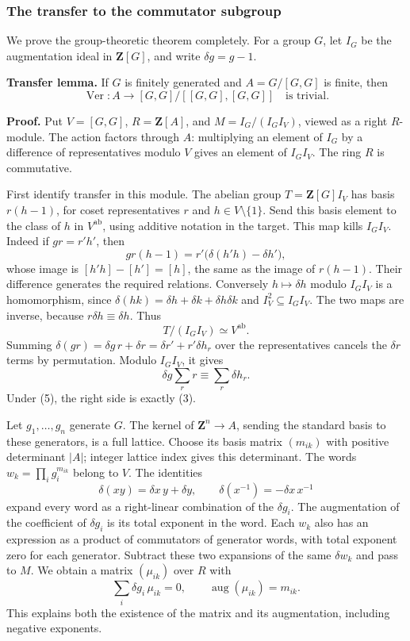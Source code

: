 \documentclass[11pt,a4paper]{article}
\begin{document}
\subsubsection{The transfer to the commutator
subgroup}\label{the-transfer-to-the-commutator-subgroup}

We prove the group-theoretic theorem completely. For a group \(G\), let
\(I_G\) be the augmentation ideal in \(\mathbf Z[G]\), and write
\(\delta g=g-1\).

\textbf{Transfer lemma.} If \(G\) is finitely generated and
\(A=G/[G,G]\) is finite, then \[
\operatorname{Ver}:A\longrightarrow [G,G]/[[G,G],[G,G]]
\quad\text{is trivial}.
\tag{4}
\]

\textbf{Proof.} Put \(V=[G,G]\), \(R=\mathbf Z[A]\), and
\(M=I_G/(I_GI_V)\), viewed as a right \(R\)-module. The action factors
through \(A\): multiplying an element of \(I_G\) by a difference of
representatives modulo \(V\) gives an element of \(I_GI_V\). The ring
\(R\) is commutative.

First identify transfer in this module. The abelian group
\(T=\mathbf Z[G]I_V\) has basis \(r(h-1)\), for coset representatives
\(r\) and \(h\in V\setminus\{1\}\). Send this basis element to the class
of \(h\) in \(V^{\mathrm{ab}}\), using additive notation in the target.
This map kills \(I_GI_V\). Indeed if \(gr=r'h'\), then \[
gr(h-1)=r'\bigl(\delta(h'h)-\delta h'\bigr),
\] whose image is \([h'h]-[h']=[h]\), the same as the image of
\(r(h-1)\). Their difference generates the required relations.
Conversely \(h\mapsto\delta h\) modulo \(I_GI_V\) is a homomorphism,
since \(\delta(hk)=\delta h+\delta k+\delta h\delta k\) and
\(I_V^2\subseteq I_GI_V\). The two maps are inverse, because
\(r\delta h\equiv\delta h\). Thus \[
T/(I_GI_V)\simeq V^{\mathrm{ab}}.
\tag{5}
\] Summing \(\delta(gr)=\delta g\,r+\delta r=\delta r'+r'\delta h_r\)
over the representatives cancels the \(\delta r\) terms by permutation.
Modulo \(I_GI_V\), it gives \[
\delta g\sum_r r\equiv\sum_r\delta h_r.
\tag{6}
\] Under (5), the right side is exactly (3).

Let \(g_1,\ldots,g_n\) generate \(G\). The kernel of
\(\mathbf Z^n\to A\), sending the standard basis to these generators, is
a full lattice. Choose its basis matrix \((m_{ik})\) with positive
determinant \(|A|\); integer lattice index gives this determinant. The
words \(w_k=\prod_i g_i^{m_{ik}}\) belong to \(V\). The identities \[
\delta(xy)=\delta x\,y+\delta y,
\qquad\delta(x^{-1})=-\delta x\,x^{-1}
\tag{7}
\] expand every word as a right-linear combination of the
\(\delta g_i\). The augmentation of the coefficient of \(\delta g_i\) is
its total exponent in the word. Each \(w_k\) also has an expression as a
product of commutators of generator words, with total exponent zero for
each generator. Subtract these two expansions of the same \(\delta w_k\)
and pass to \(M\). We obtain a matrix \((\mu_{ik})\) over \(R\) with \[
\sum_i\delta g_i\,\mu_{ik}=0,
\qquad \operatorname{aug}(\mu_{ik})=m_{ik}.
\tag{8}
\] This explains both the existence of the matrix and its augmentation,
including negative exponents.
\end{document}
